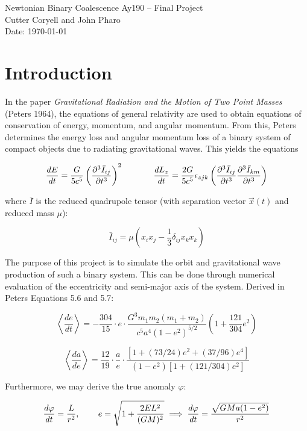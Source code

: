 \documentclass[11pt,letterpaper]{article}
\begin{document}
\begin{center}
\Large
Newtonian Binary Coalescence
Ay190 -- Final Project\\
Cutter Coryell and John Pharo\\
Date: \today
\end{center}

\section{Introduction}

In the paper \textit{Gravitational Radiation and the Motion of Two Point Masses} (Peters 1964), the equations of general relativity are used to obtain equations of conservation of energy, momentum, and angular momentum. From this, Peters determines the energy loss and angular momentum loss of a binary system of compact objects due to radiating gravitational waves. This yields the equations

$$ \frac{dE}{dt} = \frac{G}{5c^5} \left( \frac{\partial^3 \bar{I}_{ij}}{\partial t^3} \right)^2 \hspace*{.5in} \frac{dL_z}{dt} = \frac{2G}{5c^5} \epsilon_{zjk} \left( \frac{\partial^3 \bar{I}_{ij}}{\partial t^3} \frac{\partial^3 \bar{I}_{km}}{\partial t^3} \right) $$

where $\bar{I}$ is the reduced quadrupole tensor (with separation vector $\vec{x} (t)$ and reduced mass $\mu$):

$$ \bar{I}_{ij}  =\mu (x_i x_j - \frac{1}{3} \delta_{ij} x_k x_k) $$

The purpose of this project is to simulate the orbit and gravitational wave production of such a binary system. This can be done through numerical evaluation of the eccentricity and semi-major axis of the system. Derived in Peters Equations 5.6 and 5.7:

$$ \left< \frac{de}{dt} \right> = - \frac{304}{15} \cdot e \cdot \frac{G^3 m_1 m_2 (m_1 + m_2)}{c^5 a^4 (1 - e^2)^{5/2}} \left( 1 + \frac{121}{304}e^2 \right) $$

$$ \left< \frac{da}{de} \right> = \frac{12}{19} \cdot \frac{a}{e} \cdot \frac{[1 + (73/24)e^2 + (37/96)e^4]}{(1 - e^2)[1 + (121/304)e^2]} $$

Furthermore, we may derive the true anomaly $\varphi$:

$$ \frac{d \varphi}{dt} = \frac{L}{r^2}, \hspace*{.3in} e = \sqrt{1 + \frac{2EL^2}{(GM)^2}} \implies \frac{d \varphi}{dt} = \frac{\sqrt{GMa(1 - e^2)}}{r^2} $$
\end{document}
